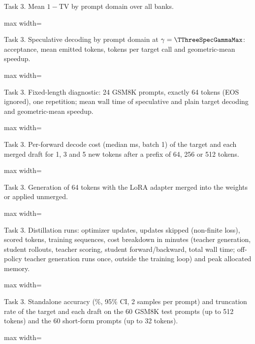\documentclass{article}
\newcommand{\tab}[1]{\begin{adjustbox}{max width=\linewidth}\end{adjustbox}}
\begin{document}
\begin{table}[!htb]
\centering\footnotesize
\caption{Task 3. Mean $1-$TV by prompt domain over all banks.}
\label{tab:t3aligndom}
\tab{t3_align_domain}
\end{table}

\begin{table}[!htb]
\centering\footnotesize
\caption{Task 3. Speculative decoding by prompt domain at $\gamma=\TThreeSpecGammaMax$: acceptance, mean emitted tokens,
tokens per target call and geometric-mean speedup.}
\label{tab:t3specdom}
\tab{t3_spec_domain}
\end{table}

\begin{table}[!htb]
\centering\footnotesize
\caption{Task 3. Fixed-length diagnostic: 24 GSM8K prompts, exactly 64 tokens (EOS ignored), one repetition; mean wall
time of speculative and plain target decoding and geometric-mean speedup.}
\label{tab:t3fixed}
\tab{t3_fixed64}
\end{table}

\begin{table}[!htb]
\centering\footnotesize
\caption{Task 3. Per-forward decode cost (median ms, batch 1) of the target and each merged draft for 1, 3 and 5 new
tokens after a prefix of 64, 256 or 512 tokens.}
\label{tab:t3decode}
\tab{t3_decode}
\end{table}

\begin{table}[!htb]
\centering\footnotesize
\caption{Task 3. Generation of 64 tokens with the LoRA adapter merged into the weights or applied unmerged.}
\label{tab:t3merge}
\tab{t3_merge}
\end{table}

\begin{table}[!htb]
\centering\footnotesize
\caption{Task 3. Distillation runs: optimizer updates, updates skipped (non-finite loss), scored tokens, training
sequences, cost breakdown in minutes (teacher generation, student rollouts, teacher scoring, student forward/backward,
total wall time; off-policy teacher generation runs once, outside the training loop) and peak allocated memory.}
\label{tab:t3cost}
\tab{t3_cost}
\end{table}

\begin{table}[!htb]
\centering\footnotesize
\caption{Task 3. Standalone accuracy (\%, 95\% CI, 2 samples per prompt) and truncation rate of the target and each draft
on the 60 GSM8K test prompts (up to 512 tokens) and the 60 short-form prompts (up to 32 tokens).}
\label{tab:t3acc}
\tab{t3_accuracy}
\end{table}
\end{document}
